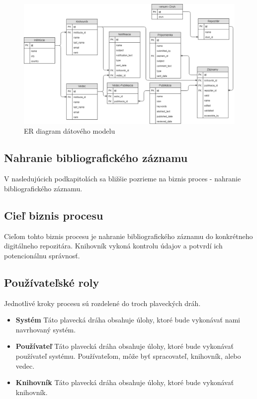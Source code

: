 \documentclass[10pt,oneside,slovak,a4paper]{article}
\begin{document}
\begin{figure}[h]
\label{datamodel}
\centering
\includegraphics[scale=0.4]{datovy_model.png} 
\caption{ER diagram dátového modelu}
\end{figure}

\subsection{Nahranie bibliografického záznamu}
V nasledujúcich podkapitolách sa bližšie pozrieme na biznis proces - nahranie bibliografického záznamu.

\subsection{Cieľ biznis procesu}
Cieľom tohto biznis procesu je nahranie bibliografického záznamu do konkrétneho digitálneho repozitára. Knihovník vykoná kontrolu údajov a potvrdí ich potencionálnu správnosť.

\subsection{Používateľské roly}
Jednotlivé kroky procesu sú rozdelené do troch plaveckých dráh.

\begin{itemize}
\item \textbf{Systém} Táto plavecká dráha obsahuje úlohy, ktoré bude vykonávať nami navrhovaný systém.
\item \textbf{Používateľ} Táto plavecká dráha obsahuje úlohy, ktoré bude vykonávať používateľ systému. Používateľom, môže byť spracovateľ, knihovník, alebo vedec.
\item \textbf{Knihovník} Táto plavecká dráha obsahuje úlohy, ktoré bude vykonávať knihovník.
\end{itemize}
\end{document}
